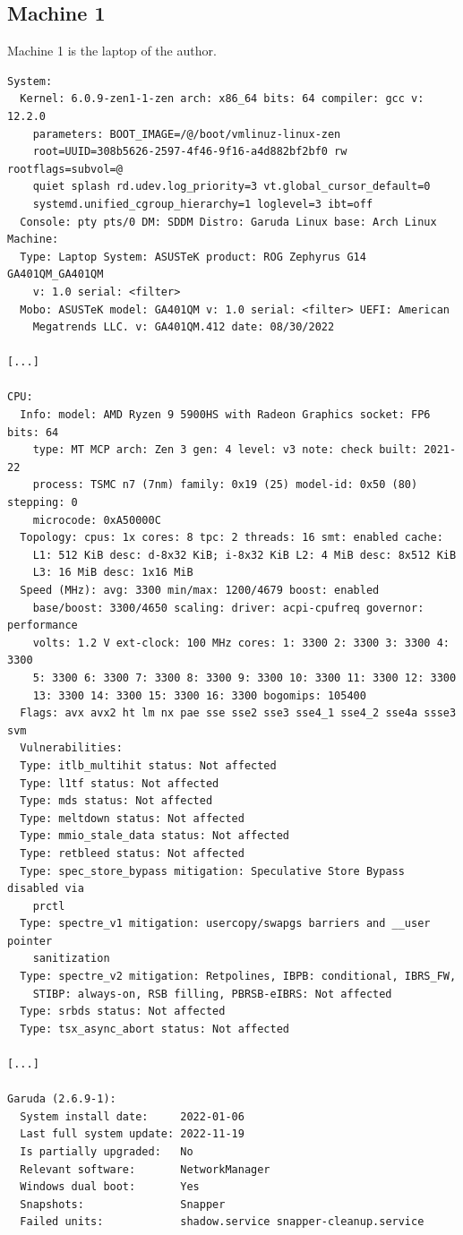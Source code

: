 \documentclass[11pt,DIV=10,final]{scrreprt} %
\begin{document}
{\begin{appendix}
\subsection{Machine 1}\label{specs:m1}
Machine 1 is the laptop of the author.
\begin{verbatim}
System:
  Kernel: 6.0.9-zen1-1-zen arch: x86_64 bits: 64 compiler: gcc v: 12.2.0
    parameters: BOOT_IMAGE=/@/boot/vmlinuz-linux-zen
    root=UUID=308b5626-2597-4f46-9f16-a4d882bf2bf0 rw rootflags=subvol=@
    quiet splash rd.udev.log_priority=3 vt.global_cursor_default=0
    systemd.unified_cgroup_hierarchy=1 loglevel=3 ibt=off
  Console: pty pts/0 DM: SDDM Distro: Garuda Linux base: Arch Linux
Machine:
  Type: Laptop System: ASUSTeK product: ROG Zephyrus G14 GA401QM_GA401QM
    v: 1.0 serial: <filter>
  Mobo: ASUSTeK model: GA401QM v: 1.0 serial: <filter> UEFI: American
    Megatrends LLC. v: GA401QM.412 date: 08/30/2022

[...]

CPU:
  Info: model: AMD Ryzen 9 5900HS with Radeon Graphics socket: FP6 bits: 64
    type: MT MCP arch: Zen 3 gen: 4 level: v3 note: check built: 2021-22
    process: TSMC n7 (7nm) family: 0x19 (25) model-id: 0x50 (80) stepping: 0
    microcode: 0xA50000C
  Topology: cpus: 1x cores: 8 tpc: 2 threads: 16 smt: enabled cache:
    L1: 512 KiB desc: d-8x32 KiB; i-8x32 KiB L2: 4 MiB desc: 8x512 KiB
    L3: 16 MiB desc: 1x16 MiB
  Speed (MHz): avg: 3300 min/max: 1200/4679 boost: enabled
    base/boost: 3300/4650 scaling: driver: acpi-cpufreq governor: performance
    volts: 1.2 V ext-clock: 100 MHz cores: 1: 3300 2: 3300 3: 3300 4: 3300
    5: 3300 6: 3300 7: 3300 8: 3300 9: 3300 10: 3300 11: 3300 12: 3300
    13: 3300 14: 3300 15: 3300 16: 3300 bogomips: 105400
  Flags: avx avx2 ht lm nx pae sse sse2 sse3 sse4_1 sse4_2 sse4a ssse3 svm
  Vulnerabilities:
  Type: itlb_multihit status: Not affected
  Type: l1tf status: Not affected
  Type: mds status: Not affected
  Type: meltdown status: Not affected
  Type: mmio_stale_data status: Not affected
  Type: retbleed status: Not affected
  Type: spec_store_bypass mitigation: Speculative Store Bypass disabled via
    prctl
  Type: spectre_v1 mitigation: usercopy/swapgs barriers and __user pointer
    sanitization
  Type: spectre_v2 mitigation: Retpolines, IBPB: conditional, IBRS_FW,
    STIBP: always-on, RSB filling, PBRSB-eIBRS: Not affected
  Type: srbds status: Not affected
  Type: tsx_async_abort status: Not affected

[...]

Garuda (2.6.9-1):
  System install date:     2022-01-06
  Last full system update: 2022-11-19
  Is partially upgraded:   No
  Relevant software:       NetworkManager
  Windows dual boot:       Yes
  Snapshots:               Snapper
  Failed units:            shadow.service snapper-cleanup.service
\end{verbatim}


\end{appendix}}
\end{document}
